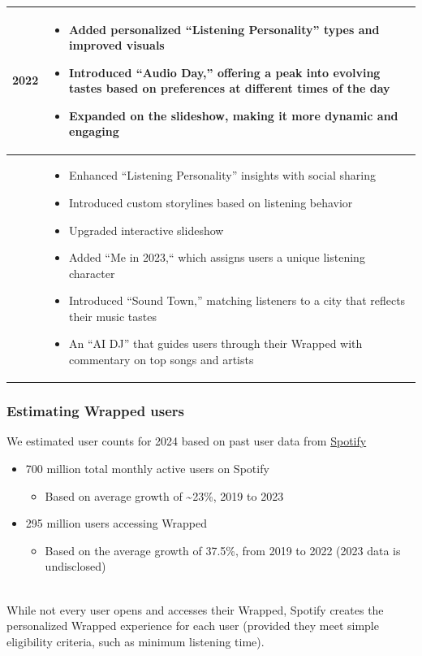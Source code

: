 \begin{table}[htbp]
{\begin{tabular}{|p{}|p{}|}
\hline
2022 & \begin{itemize} \tightlist \item Added personalized ``Listening Personality'' types and improved visuals \item Introduced ``Audio Day,'' offering a peak into evolving tastes based on preferences at different times of the day \item Expanded on the slideshow, making it more dynamic and engaging \end{itemize} \\
\hline
\hfill\break \hfill\break 2023 & \begin{itemize} \tightlist \item Enhanced ``Listening Personality'' insights with social sharing \item Introduced custom storylines based on listening behavior \item Upgraded interactive slideshow \item Added ``Me in 2023,`` which assigns users a unique listening character \item Introduced ``Sound Town,'' matching listeners to a city that reflects their music tastes \item An ``AI DJ'' that guides users through their Wrapped with commentary on top songs and artists \end{itemize} \\
\hline
\end{tabular}
}
\end{table}

\subsubsection{Estimating Wrapped users}\label{3YrZfW_LyTwrf6fueeP8J}


We estimated user counts for 2024 based on past user data from \href{https://investors.spotify.com/financials/default.aspx\#quarterly-results}{Spotify}~

\begin{itemize}
\item
\protect{}\label{YrfkaclowAq17PkmBBLpO}
700 million total monthly active users on Spotify

\begin{itemize}
\item
Based on average growth of \textasciitilde23\%, 2019 to 2023
\end{itemize}
\item
\protect{}\label{eiO3kmiUxY5eGK2meaWIW}
295 million users accessing Wrapped~

\begin{itemize}
\item
Based on the average growth of 37.5\%, from 2019 to 2022 (2023 data is undisclosed)
\end{itemize}
\end{itemize}
\\
While not every user opens and accesses their Wrapped, Spotify creates the personalized Wrapped experience for each user (provided they meet simple eligibility criteria, such as minimum listening time).

